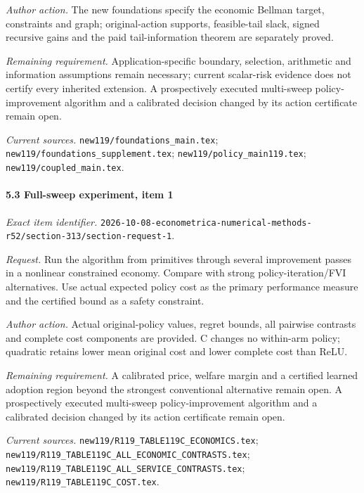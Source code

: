 \par\emph{Author action.} The new foundations specify the economic Bellman target, constraints and graph; original-action supports, feasible-tail slack, signed recursive gains and the paid tail-information theorem are separately proved.

\par\emph{Remaining requirement.} Application-specific boundary, selection, arithmetic and information assumptions remain necessary; current scalar-risk evidence does not certify every inherited extension. A prospectively executed multi-sweep policy-improvement algorithm and a calibrated decision changed by its action certificate remain open.

\par\emph{Current sources.} \nolinkurl{new119/foundations_main.tex}; \nolinkurl{new119/foundations_supplement.tex}; \nolinkurl{new119/policy_main119.tex}; \nolinkurl{new119/coupled_main.tex}.

\paragraph{5.3 Full-sweep experiment, item 1}

\emph{Exact item identifier.} \nolinkurl{2026-10-08-econometrica-numerical-methods-r52/section-313/section-request-1}.

\par\emph{Request.} Run the algorithm from primitives through several improvement passes in a nonlinear constrained economy. Compare with strong policy-iteration/\allowbreak{}FVI alternatives. Use actual expected policy cost as the primary performance measure and the certified bound as a safety constraint.

\par\emph{Author action.} Actual original-policy values, regret bounds, all pairwise contrasts and complete cost components are provided. C changes no within-arm policy; quadratic retains lower mean original cost and lower complete cost than ReLU.

\par\emph{Remaining requirement.} A calibrated price, welfare margin and a certified learned adoption region beyond the strongest conventional alternative remain open. A prospectively executed multi-sweep policy-improvement algorithm and a calibrated decision changed by its action certificate remain open.

\par\emph{Current sources.} \nolinkurl{new119/R119_TABLE119C_ECONOMICS.tex}; \nolinkurl{new119/R119_TABLE119C_ALL_ECONOMIC_CONTRASTS.tex}; \nolinkurl{new119/R119_TABLE119C_ALL_SERVICE_CONTRASTS.tex}; \nolinkurl{new119/R119_TABLE119C_COST.tex}.


